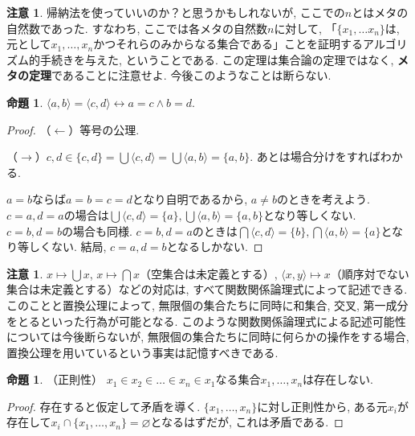 \documentclass[a4paper, twoside]{bxjsarticle}
\theoremstyle{definition}
\newtheorem{prop}[thm]{命題}
\newtheorem{rem}[thm]{注意}
\begin{document}
        \begin{rem}
            帰納法を使っていいのか？と思うかもしれないが, ここでの$n$とはメタの自然数であった. すなわち, ここでは各メタの自然数$n$に対して, 「$\{x_1, \dots x_n\}$は, 元として$x_1, \dots , x_n$かつそれらのみからなる集合である」ことを証明するアルゴリズム的手続きを与えた, ということである. この定理は集合論の定理ではなく, \textbf{メタの定理}であることに注意せよ. 今後このようなことは断らない.
        \end{rem}
        \begin{prop}
            $\langle a, b\rangle = \langle c, d\rangle \leftrightarrow a=c \land b=d$.
        \end{prop}
        \begin{proof}
        （$\leftarrow$）等号の公理.
        
        （$\rightarrow$）$c, d \in \{c, d\} = \bigcup \langle c, d \rangle = \bigcup \langle a, b\rangle = \{a, b\}$. あとは場合分けをすればわかる. 
        
        $a=b$ならば$a=b=c=d$となり自明であるから, $a\neq b$のときを考えよう. $c=a, d=a$の場合は$\bigcup \langle c, d \rangle = \{a\}, \bigcup \langle a, b \rangle = \{a, b\}$となり等しくない. $c=b, d=b$の場合も同様. $c=b, d=a$のときは$\bigcap \langle c, d \rangle = \{b\}, \bigcap \langle a, b \rangle = \{a\}$となり等しくない. 結局, $c=a, d=b$となるしかない.
        \end{proof}
        \begin{rem}
            $x \mapsto \bigcup x$, $x \mapsto \bigcap x$（空集合は未定義とする）, $\langle x, y \rangle \mapsto x$（順序対でない集合は未定義とする）などの対応は, すべて関数関係論理式によって記述できる. このことと置換公理によって, 無限個の集合たちに同時に和集合, 交叉, 第一成分をとるといった行為が可能となる. このような関数関係論理式による記述可能性については今後断らないが, 無限個の集合たちに同時に何らかの操作をする場合, 置換公理を用いているという事実は記憶すべきである.
        \end{rem}
        \begin{prop}
            （正則性） $x_1 \in x_2 \in \dots \in x_n \in x_1$なる集合$x_1, \dots , x_n$は存在しない.
        \end{prop}
        \begin{proof}
            存在すると仮定して矛盾を導く. $\{x_1, \dots , x_n\}$に対し正則性から, ある元$x_i$が存在して$x_i \cap \{x_1, \dots , x_n\} = \varnothing$となるはずだが, これは矛盾である.
        \end{proof}
\end{document}
